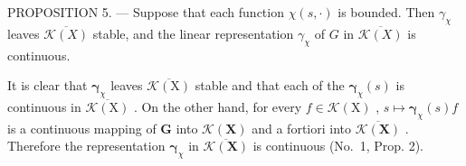 PROPOSITION 5. --- Suppose that each function \(\chi(s,\cdot)\) is bounded. Then \(\gamma_{\chi}\) leaves \(\overline{\mathcal{K}(X)}\) stable, and the linear representation \(\gamma_{\chi}\) of \(G\) in \(\overline{\mathcal{K}(X)}\) is continuous.

It is clear that \(\pmb{\gamma}_{\chi}\) leaves \(\overline{\mathcal{K}(\mathrm{X})}\) stable and that each of the \(\pmb{\gamma}_{\chi}(s)\) is continuous in \(\overline{\mathcal{K}(\mathrm{X})}\) . On the other hand, for every \(f \in \mathcal{K}(\mathrm{X})\) , \(s \mapsto \pmb{\gamma}_{\chi}(s)f\) is a continuous mapping of \(\mathbf{G}\) into \(\mathcal{K}(\mathbf{X})\) and a fortiori into \(\overline{\mathcal{K}(\mathbf{X})}\) . Therefore the representation \(\pmb{\gamma}_{\chi}\) in \(\overline{\mathcal{K}(\mathbf{X})}\) is continuous (No.~1, Prop. 2).

